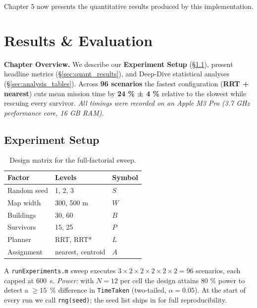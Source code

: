\documentclass[12pt,a4paper]{report}
\begin{document}
\vspace{0.6em}
Chapter 5 now presents the quantitative results produced by this implementation.

\chapter{Results \& Evaluation}
\label{ch:results}

\textbf{Chapter Overview.}
We describe our \textbf{Experiment Setup} (\S\ref{sec:experiment_setup}),
present headline metrics (\S\ref{sec:quant_results}),
and Deep-Dive statistical analyses (\S\ref{sec:analysis_tables}).
Across \textbf{96 scenarios} the fastest configuration
(\textbf{RRT + nearest}) cuts mean mission time by
\textbf{24 \% ± 4 \%} relative to the slowest while rescuing
every survivor.
\emph{All timings were recorded on an Apple M3 Pro
(3.7 GHz performance core, 16 GB RAM).}

\section{Experiment Setup}%
\label{sec:experiment_setup}

\begin{table}[H]
\centering
\caption{Design matrix for the full-factorial sweep.}
\label{tab:designMatrix}
\begin{tabular}{@{}lll@{}}
\toprule
\textbf{Factor} & \textbf{Levels} & \textbf{Symbol}\\
\midrule
Random seed     & 1, 2, 3              & $S$\\
Map width       & 300, 500 m           & $W$\\
Buildings       & 30, 60               & $B$\\
Survivors       & 15, 25               & $P$\\
Planner         & RRT, RRT*            & $L$\\
Assignment      & nearest, centroid    & $A$\\
\bottomrule
\end{tabular}
\end{table}

A \texttt{runExperiments.m} sweep executes  
\(
3 \times 2 \times 2 \times 2 \times 2 \times 2 = 96
\)
scenarios, each capped at \SI{600}{\second}.  
\textit{Power:} with \(N = 12\) per cell the design attains
80 \% power to detect a \(\ge 15\)\, \% difference in
\texttt{TimeTaken} (two-tailed, \(\alpha = 0.05\)).  
At the start of every run we call \verb|rng(seed)|; the seed list ships
in  for full reproducibility.
\end{document}
